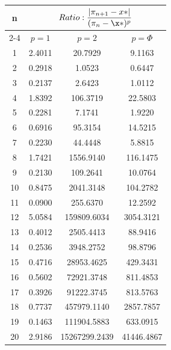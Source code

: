 \documentclass{article}
\providecommand{\abs}[1]{\lvert#1\rvert}
\begin{document}
\begin{tabular}{|c|c|c|c|}
\hline
\multirow{2}{*}{n} & \multicolumn{3}{|c|}{$Ratio:\displaystyle\frac{\abs{\pi_{n+1}-x*}}{({\pi_{n}-\x*})^p}$} \\
\cline{2-4}
 & $p=1$ & $p=2$ & $p=\Phi$ \\
\hline
 1 & 2.4011 & 20.7929 & 9.1163 \\ 
  2 & 0.2918 & 1.0523 & 0.6447 \\ 
  3 & 0.2137 & 2.6423 & 1.0112 \\ 
  4 & 1.8392 & 106.3719 & 22.5803 \\ 
  5 & 0.2281 & 7.1741 & 1.9220 \\ 
  6 & 0.6916 & 95.3154 & 14.5215 \\ 
  7 & 0.2230 & 44.4448 & 5.8815 \\ 
  8 & 1.7421 & 1556.9140 & 116.1475 \\ 
  9 & 0.2130 & 109.2641 & 10.0764 \\ 
 10 & 0.8475 & 2041.3148 & 104.2782 \\ 
 11 & 0.0900 & 255.6370 & 12.2592 \\ 
 12 & 5.0584 & 159809.6034 & 3054.3121 \\ 
 13 & 0.4012 & 2505.4413 & 88.9416 \\ 
 14 & 0.2536 & 3948.2752 & 98.8796 \\ 
 15 & 0.4716 & 28953.4625 & 429.3431 \\ 
 16 & 0.5602 & 72921.3748 & 811.4853 \\ 
 17 & 0.3926 & 91222.3745 & 813.5763 \\ 
 18 & 0.7737 & 457979.1140 & 2857.7857 \\ 
 19 & 0.1463 & 111904.5883 & 633.0915 \\ 
 20 & 2.9186 & 15267299.2439 & 41446.4867 \\ 
 \hline 
\end{tabular}
\end{document}
